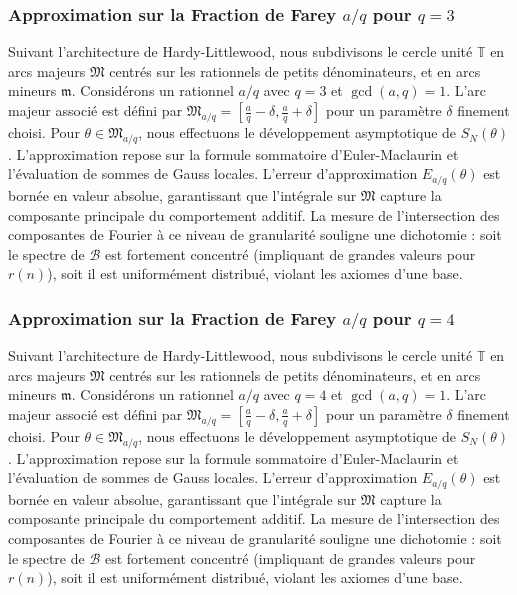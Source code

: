 \documentclass[11pt,a4paper]{article}
\begin{document}
\subsubsection{Approximation sur la Fraction de Farey $a/q$ pour $q=3$}
Suivant l'architecture de Hardy-Littlewood, nous subdivisons le cercle unité $\mathbb{T}$ en arcs majeurs $\mathfrak{M}$ centrés sur les rationnels de petits dénominateurs, et en arcs mineurs $\mathfrak{m}$.
Considérons un rationnel $a/q$ avec $q = 3$ et $\gcd(a,q)=1$. L'arc majeur associé est défini par $\mathfrak{M}_{a/q} = [\frac{a}{q} - \delta, \frac{a}{q} + \delta]$ pour un paramètre $\delta$ finement choisi.
Pour $\theta \in \mathfrak{M}_{a/q}$, nous effectuons le développement asymptotique de $S_N(\theta)$.
L'approximation repose sur la formule sommatoire d'Euler-Maclaurin et l'évaluation de sommes de Gauss locales.
L'erreur d'approximation $E_{a/q}(\theta)$ est bornée en valeur absolue, garantissant que l'intégrale sur $\mathfrak{M}$ capture la composante principale du comportement additif.
La mesure de l'intersection des composantes de Fourier à ce niveau de granularité souligne une dichotomie : soit le spectre de $\mathcal{B}$ est fortement concentré (impliquant de grandes valeurs pour $r(n)$), soit il est uniformément distribué, violant les axiomes d'une base.
\subsubsection{Approximation sur la Fraction de Farey $a/q$ pour $q=4$}
Suivant l'architecture de Hardy-Littlewood, nous subdivisons le cercle unité $\mathbb{T}$ en arcs majeurs $\mathfrak{M}$ centrés sur les rationnels de petits dénominateurs, et en arcs mineurs $\mathfrak{m}$.
Considérons un rationnel $a/q$ avec $q = 4$ et $\gcd(a,q)=1$. L'arc majeur associé est défini par $\mathfrak{M}_{a/q} = [\frac{a}{q} - \delta, \frac{a}{q} + \delta]$ pour un paramètre $\delta$ finement choisi.
Pour $\theta \in \mathfrak{M}_{a/q}$, nous effectuons le développement asymptotique de $S_N(\theta)$.
L'approximation repose sur la formule sommatoire d'Euler-Maclaurin et l'évaluation de sommes de Gauss locales.
L'erreur d'approximation $E_{a/q}(\theta)$ est bornée en valeur absolue, garantissant que l'intégrale sur $\mathfrak{M}$ capture la composante principale du comportement additif.
La mesure de l'intersection des composantes de Fourier à ce niveau de granularité souligne une dichotomie : soit le spectre de $\mathcal{B}$ est fortement concentré (impliquant de grandes valeurs pour $r(n)$), soit il est uniformément distribué, violant les axiomes d'une base.
\end{document}
